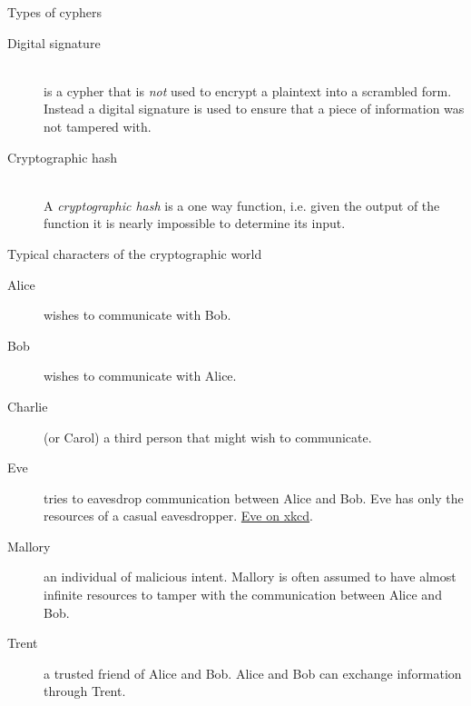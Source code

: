 \documentclass[hyperref={colorlinks=true}]{beamer}
\begin{document}
\begin{frame}{Types of cyphers}
  \begin{description}
    \item[Digital signature] \hfill \\
is a cypher that is \emph{not} used to encrypt a plaintext into a scrambled
form.  Instead a digital signature is used to ensure that a piece of
information was not tampered with.
    \item[Cryptographic hash] \hfill \\
A \emph{cryptographic hash} is a one way function, i.e. given the output of the
function it is nearly impossible to determine its input.
  \end{description}
\end{frame}

\begin{frame}{Typical characters of the cryptographic world}
  \begin{description}
    \item[Alice] wishes to communicate with Bob.
    \item[Bob] wishes to communicate with Alice.
    \item[Charlie] (or Carol) a third person that might wish to communicate.
    \item[Eve] tries to eavesdrop communication between Alice and Bob.  Eve has
only the resources of a casual eavesdropper.
\href{https://xkcd.com/177/}{Eve on xkcd}.
    \item[Mallory] an individual of malicious intent.  Mallory is often assumed
to have almost infinite resources to tamper with the communication between
Alice and Bob.
    \item[Trent] a trusted friend of Alice and Bob.  Alice and Bob can exchange
information through Trent.
  \end{description}
\end{frame}
\end{document}
